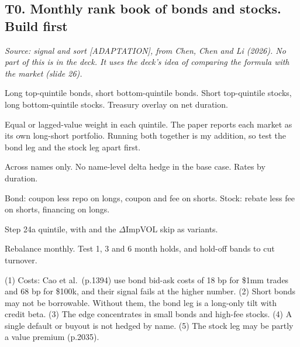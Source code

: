 \documentclass[10pt,a4paper]{article}
\newcommand{\ADAPT}{\textsf{\footnotesize\textcolor{tagadapt}{[ADAPTATION]}}}
\begin{document}
\subsection*{T0. Monthly rank book of bonds and stocks. Build first}
\textit{Source: signal and sort \ADAPT, from Chen, Chen and Li (2026). No part of this is in the deck. It uses the deck's idea of comparing the formula with the market (slide 26).}
\begin{description}[style=sameline,leftmargin=1.9cm,labelwidth=1.7cm,labelsep=0.2cm,itemsep=1pt,parsep=0pt,font=\bfseries]
\item[Legs] Long top-quintile bonds, short bottom-quintile bonds. Short top-quintile stocks, long bottom-quintile stocks. Treasury overlay on net duration.
\item[Size] Equal or lagged-value weight in each quintile. The paper reports each market as its own long-short portfolio. Running both together is my addition, so test the bond leg and the stock leg apart first.
\item[Hedge] Across names only. No name-level delta hedge in the base case. Rates by duration.
\item[Carry] Bond: coupon less repo on longs, coupon and fee on shorts. Stock: rebate less fee on shorts, financing on longs.
\item[Signal] Step 24a quintile, with  and the $\Delta$ImpVOL skip as variants.
\item[Exit] Rebalance monthly. Test 1, 3 and 6 month holds, and hold-off bands to cut turnover.
\item[Goes wrong] (1) Costs: Cao et al.\ (p.1394) use bond bid-ask costs of 18 bp for \$1mm trades and 68 bp for \$100k, and their signal fails at the higher number. (2) Short bonds may not be borrowable. Without them, the bond leg is a long-only tilt with credit beta. (3) The edge concentrates in small bonds and high-fee stocks. (4) A single default or buyout is not hedged by name. (5) The stock leg may be partly a value premium (p.2035).
\end{description}

\end{document}
